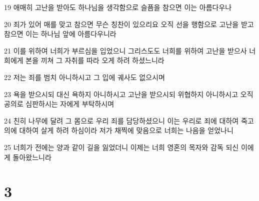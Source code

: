 \par 19 애매히 고난을 받아도 하나님을 생각함으로 슬픔을 참으면 이는 아름다우나
\par 20 죄가 있어 매를 맞고 참으면 무슨 칭찬이 있으리요 오직 선을 행함으로 고난을 받고 참으면 이는 하나님 앞에 아름다우니라
\par 21 이를 위하여 너희가 부르심을 입었으니 그리스도도 너희를 위하여 고난을 받으사 너희에게 본을 끼쳐 그 자취를 따라 오게 하려 하셨느니라
\par 22 저는 죄를 범치 아니하시고 그 입에 궤사도 없으시며
\par 23 욕을 받으시되 대신 욕하지 아니하시고 고난을 받으시되 위협하지 아니하시고 오직 공의로 심판하시는 자에게 부탁하시며
\par 24 친히 나무에 달려 그 몸으로 우리 죄를 담당하셨으니 이는 우리로 죄에 대하여 죽고 의에 대하여 살게 하려 하심이라 저가 채찍에 맞음으로 너희는 나음을 얻었나니
\par 25 너희가 전에는 양과 같이 길을 잃었더니 이제는 너희 영혼의 목자와 감독 되신 이에게 돌아왔느니라

\chapter{3}

